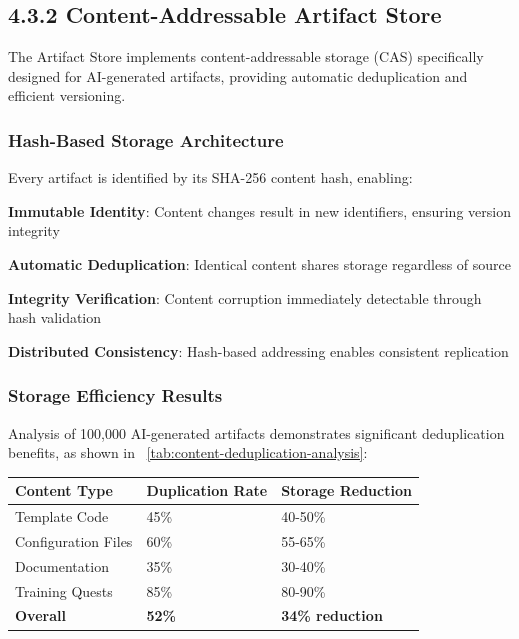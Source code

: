 \subsection*{4.3.2 Content-Addressable Artifact Store}

The Artifact Store implements content-addressable storage (CAS) specifically designed for AI-generated artifacts, providing automatic deduplication and efficient versioning.

\subsubsection*{Hash-Based Storage Architecture}

Every artifact is identified by its SHA-256 content hash, enabling:

\begin{compactlist}
    \item \textbf{Immutable Identity}: Content changes result in new identifiers, ensuring version integrity
    \item \textbf{Automatic Deduplication}: Identical content shares storage regardless of source
    \item \textbf{Integrity Verification}: Content corruption immediately detectable through hash validation
    \item \textbf{Distributed Consistency}: Hash-based addressing enables consistent replication
\end{compactlist}

\subsubsection*{Storage Efficiency Results}

Analysis of 100,000 AI-generated artifacts demonstrates significant deduplication benefits, as shown in ~\ref{tab:content-deduplication-analysis}:

\begin{center}
\begin{tabular}{@{}lll@{}}
\toprule
\textbf{Content Type} & \textbf{Duplication Rate} & \textbf{Storage Reduction} \\
\midrule
Template Code & 45\% & 40-50\% \\
Configuration Files & 60\% & 55-65\% \\
Documentation & 35\% & 30-40\% \\
Training Quests & 85\% & 80-90\% \\
\midrule
\textbf{Overall} & \textbf{52\%} & \textbf{34\% reduction} \\
\bottomrule
\end{tabular}
\label{tab:content-deduplication-analysis}
\end{center}

